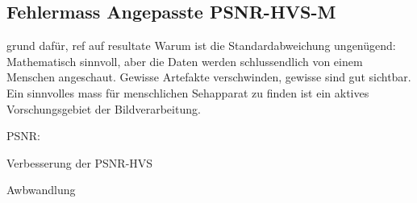 \subsection{Fehlermass Angepasste PSNR-HVS-M}\label{testsetup:psnr}
grund dafür, ref auf resultate
Warum ist die Standardabweichung ungenügend: Mathematisch sinnvoll, aber die Daten werden schlussendlich von einem Menschen angeschaut. Gewisse Artefakte verschwinden, gewisse sind gut sichtbar. Ein sinnvolles mass für menschlichen Sehapparat zu finden ist ein aktives Vorschungsgebiet der Bildverarbeitung.

PSNR:

Verbesserung der PSNR-HVS

Awbwandlung